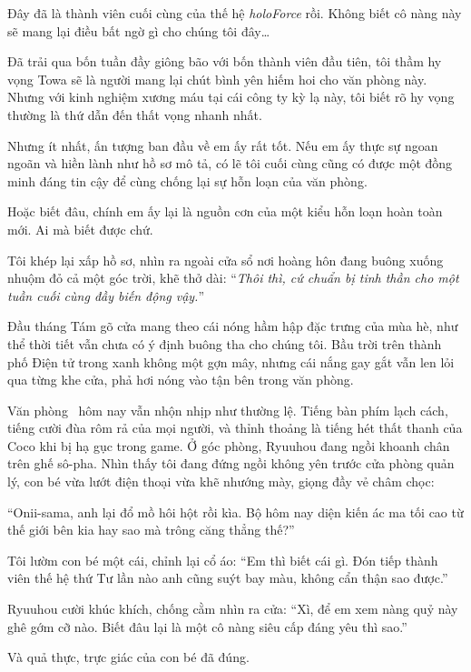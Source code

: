 \documentclass[../main.tex]{subfiles}
\begin{document}
\chrint

Đây đã là thành viên cuối cùng của thế hệ \textit{holoForce} rồi. Không biết cô nàng này sẽ mang lại điều bất ngờ gì cho chúng tôi đây\dots

Đã trải qua bốn tuần đầy giông bão với bốn thành viên đầu tiên, tôi thầm hy vọng Towa sẽ là người mang lại chút bình yên hiếm hoi cho văn phòng này. Nhưng với kinh nghiệm xương máu tại cái công ty kỳ lạ này, tôi biết rõ hy vọng thường là thứ dẫn đến thất vọng nhanh nhất.

Nhưng ít nhất, ấn tượng ban đầu về em ấy rất tốt. Nếu em ấy thực sự ngoan ngoãn và hiền lành như hồ sơ mô tả, có lẽ tôi cuối cùng cũng có được một đồng minh đáng tin cậy để cùng chống lại sự hỗn loạn của văn phòng.

Hoặc biết đâu, chính em ấy lại là nguồn cơn của một kiểu hỗn loạn hoàn toàn mới. Ai mà biết được chứ.

Tôi khép lại xấp hồ sơ, nhìn ra ngoài cửa sổ nơi hoàng hôn đang buông xuống nhuộm đỏ cả một góc trời, khẽ thở dài: ``\textit{Thôi thì, cứ chuẩn bị tinh thần cho một tuần cuối cùng đầy biến động vậy.}''

\il

Đầu tháng Tám gõ cửa mang theo cái nóng hầm hập đặc trưng của mùa hè, như thể thời tiết vẫn chưa có ý định buông tha cho chúng tôi. Bầu trời trên thành phố Điện tử trong xanh không một gợn mây, nhưng cái nắng gay gắt vẫn len lỏi qua từng khe cửa, phả hơi nóng vào tận bên trong văn phòng.

Văn phòng \hll\ hôm nay vẫn nhộn nhịp như thường lệ. Tiếng bàn phím lạch cách, tiếng cười đùa rôm rả của mọi người, và thỉnh thoảng là tiếng hét thất thanh của Coco khi bị hạ gục trong game. Ở góc phòng, Ryuuhou đang ngồi khoanh chân trên ghế sô-pha. Nhìn thấy tôi đang đứng ngồi không yên trước cửa phòng quản lý, con bé vừa lướt điện thoại vừa khẽ nhướng mày, giọng đầy vẻ châm chọc:

``Onii-sama, anh lại đổ mồ hôi hột rồi kìa. Bộ hôm nay diện kiến ác ma tối cao từ thế giới bên kia hay sao mà trông căng thẳng thế?''

Tôi lườm con bé một cái, chỉnh lại cổ áo: ``Em thì biết cái gì. Đón tiếp thành viên thế hệ thứ Tư lần nào anh cũng suýt bay màu, không cẩn thận sao được.''

Ryuuhou cười khúc khích, chống cằm nhìn ra cửa: ``Xì, để em xem nàng quỷ này ghê gớm cỡ nào. Biết đâu lại là một cô nàng siêu cấp đáng yêu thì sao.''

Và quả thực, trực giác của con bé đã đúng.
\end{document}

